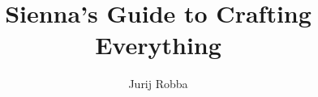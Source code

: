 \documentclass[12pt,a4paper]{report}
\begin{document}
\begin{titlepage}

\title{Sienna's Guide to Crafting Everything}
\author{Jurij Robba}

\maketitle

\end{titlepage}




\tableofcontents




























\end{document}
